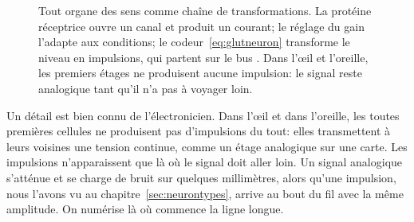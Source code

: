 \begin{figure}[t]
\centering
{}
\caption{Tout organe des sens comme chaîne de transformations. La protéine réceptrice ouvre un canal et produit un courant; le réglage du gain l'adapte aux conditions; le codeur~\eqref{eq:glutneuron} transforme le niveau en impulsions, qui partent sur le bus . Dans l'œil et l'oreille, les premiers étages ne produisent aucune impulsion: le signal reste analogique tant qu'il n'a pas à voyager loin.}
\label{fig:transducer}
\end{figure}

Un détail est bien connu de l'électronicien. Dans l'œil et dans l'oreille, les toutes premières cellules ne produisent pas d'impulsions du tout: elles transmettent à leurs voisines une tension continue, comme un étage analogique sur une carte. Les impulsions n'apparaissent que là où le signal doit aller loin. Un signal analogique s'atténue et se charge de bruit sur quelques millimètres, alors qu'une impulsion, nous l'avons vu au chapitre~\ref{sec:neurontypes}, arrive au bout du fil avec la même amplitude. On numérise là où commence la ligne longue.

